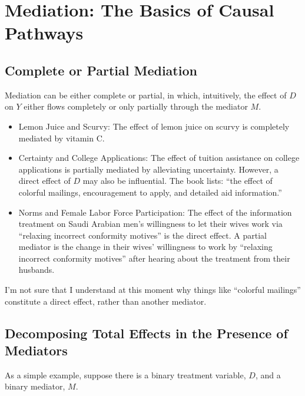 \documentclass[10pt]{article}
\begin{document}
\section{Mediation: The Basics of Causal Pathways}

\subsection{Complete or Partial Mediation}

Mediation can be either complete or partial, in which, intuitively, 
the effect of $D$ on $Y$ either flows completely or only partially 
through the mediator $M$.

\begin{itemize}
    \item Lemon Juice and Scurvy: The effect of lemon juice on scurvy is completely mediated 
        by vitamin C. 
    \item Certainty and College Applications: 
        The effect of tuition assistance on 
        college applications is partially mediated by 
        alleviating uncertainty. However, a direct effect of $D$ 
        may also be influential. The book lists: 
        ``the effect of colorful mailings, encouragement to apply, 
        and detailed aid information.'' 
    \item Norms and Female Labor Force Participation: 
        The effect of the information treatment on Saudi Arabian men's 
        willingness to let their wives work via 
        ``relaxing incorrect conformity motives'' 
        is the direct effect.
        A partial mediator is the change in their wives' willingness 
        to work by ``relaxing incorrect conformity motives''
        after hearing about the treatment from their husbands.
\end{itemize}

\begin{questions}
    I'm not sure that I understand at this moment why things 
    like ``colorful mailings'' constitute a direct effect, rather 
    than another mediator.
\end{questions}


\subsection{Decomposing Total Effects in the Presence of Mediators}

As a simple example, suppose there is 
a binary treatment variable, $D$, 
and a binary mediator, $M$.
\end{document}
